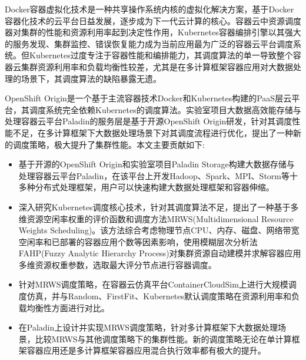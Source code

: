 \begin{cabstract}
  Docker容器虚拟化技术是一种共享操作系统内核的虚拟化解决方案，基于Docker容器化技术的云平台日益发展，逐步成为下一代云计算的核心。容器云中资源调度器对集群的性能和资源利用率起到决定性作用，Kubernetes容器编排引擎以其强大的服务发现、集群监控、错误恢复能力成为当前应用最为广泛的容器云平台调度系统。但Kubernetes过度专注于容器性能和编排能力，其调度算法的单一导致整个容器云集群资源利用率和负载均衡性较差，尤其是在多计算框架容器应用对大数据处理的场景下，其调度算法的缺陷暴露无遗。

OpenShift Origin是一个基于主流容器技术Docker和Kubernetes构建的PaaS层云平台，其调度系统完全依赖Kubernetes的调度算法。实验室项目大数据高效能存储与处理容器云平台Paladin的服务层是基于开源OpenShift Origin研发，针对其调度性能不足，在多计算框架下大数据处理场景下对其调度流程进行优化，提出了一种新的调度策略，极大提升了集群性能。本文主要贡献如下:
  \begin{itemize}
  \item 基于开源的OpenShift Origin和实验室项目Paladin Storage构建大数据存储与处理容器云平台Paladin，在该平台上开发Hadoop、Spark、MPI、Storm等十多种分布式处理框架，用户可以快速构建大数据处理框架和容器伸缩。
  \item 深入研究Kubernetes调度核心技术，针对其调度算法不足，提出了一种基于多维资源空闲率权重的评价函数和调度方法MRWS(Multidimensional Resource Weights Scheduling)。该方法综合考虑物理节点CPU、内存、磁盘、网络带宽空闲率和已部署的容器应用个数等因素影响，使用模糊层次分析法FAHP(Fuzzy Analytic Hierarchy Process)对集群资源自动建模并求解容器应用多维资源权重参数，选取最大评分节点进行容器调度。
  \item 针对MRWS调度策略，在容器云仿真平台ContainerCloudSim上进行大规模调度仿真，并与Random、FirstFit、Kubernetes默认调度策略在资源利用率和负载均衡性方面进行对比。
  \item 在Paladin上设计并实现MRWS调度策略，针对多计算框架下大数据处理场景，比较MRWS与其他调度策略下的集群性能。新的调度策略无论在单计算框架容器应用还是多计算框架容器应用混合执行效率都有极大的提升。
  \end{itemize}
\end{cabstract}



